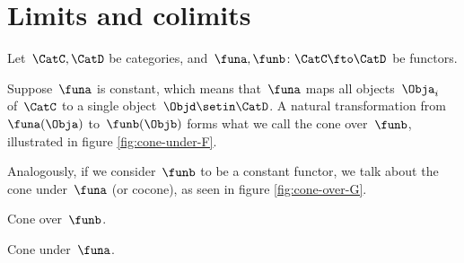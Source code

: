 
\section{Limits and colimits}

Let~$\CatC, \CatD$ be categories, and~$\funa, \funb\colon\CatC\fto\CatD$ be functors.

Suppose~$\funa$ is constant, which means that~$\funa$ maps all objects~$\Obja_i$ of~$\CatC$ to a single object~$\Objd \setin \CatD$.
A natural transformation from~$\funa(\Obja)$ to~$\funb(\Objb)$ forms what we call the cone over~$\funb$, illustrated in figure \cref{fig:cone-under-F}.

Analogously, if we consider~$\funb$ to be a constant functor, we talk about the cone under~$\funa$ (or cocone), as seen in figure \cref{fig:cone-over-G}.

\begin{marginfigure}
    \centering
    \caption{Cone over~$\funb$.
    }
    \label{fig:cone-over-G}
\end{marginfigure}

\begin{marginfigure}
    \centering
    \label{fig:cone-under-F}
    \caption{Cone under~$\funa$.}
\end{marginfigure}


